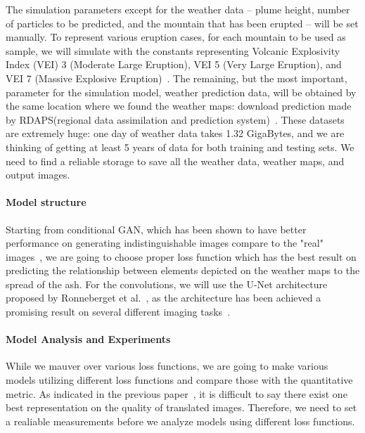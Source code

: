 \documentclass{article}
\begin{document}
\begin{doublespacing}
{  The simulation parameters except for the weather data – plume height, number of particles to be 
  predicted, and the mountain that has been erupted – will be set manually. To represent various 
  eruption cases, for each mountain to be used as sample, we will simulate with the constants 
  representing Volcanic Explosivity Index (VEI) 3 (Moderate Large Eruption), VEI 5 (Very Large 
  Eruption), and VEI 7 (Massive Explosive Eruption)~\citep[p. 1232]{Newhall1982}. The remaining, but
  the most important, parameter for the simulation model, weather prediction data, will be obtained 
  by the same location where we found the weather maps: download prediction made by RDAPS(regional 
  data assimilation and prediction system)~\citep{MDOP}. These datasets are extremely huge: one day 
  of weather data takes 1.32 GigaBytes, and we are thinking of getting at least 5 years of data for 
  both training and testing sets. We need to find a reliable storage to save all the weather data, 
  weather maps, and output images.

  \paragraph{Model structure}
  Starting from conditional GAN, which has been shown to have better performance on generating 
  indistinguishable images compare to the "real" images~\citet{isola2016imagetoimage}, we are going 
  to choose proper loss function which has the best result on predicting the relationship between 
  elements depicted on the weather maps to the spread of the ash. For the convolutions, we will use
  the U-Net architecture proposed by Ronneberget et al.~\citet{ronneberger2015unet}, as the
  architecture has been achieved a promising result on several different imaging 
  tasks~\citep{isola2016imagetoimage, james2018simtoreal}.

  \paragraph{Model Analysis and Experiments}
  While we mauver over various loss functions, we are going to make various models utilizing 
  different loss functions and compare those with the quantitative metric. As indicated in the 
  previous paper~\citet{isola2016imagetoimage}, it is difficult to say there exist one best 
  representation on the quality of translated images. Therefore, we need to set a realiable 
  measurements before we analyze models using different loss functions.

}
\end{doublespacing}
\end{document}
